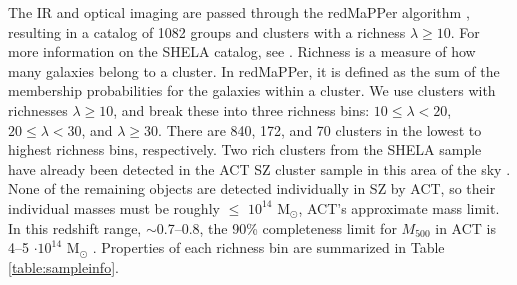 \documentclass[a4paper,fleqn,usenatbib]{mnras}
\begin{document}
The IR and optical imaging are passed through the redMaPPer algorithm \citep{2014ApJ...785..104R}, resulting in a catalog of 1082 groups and clusters with a richness $\lambda \geq 10.$ 
For more information on the SHELA catalog, see \cite{2019ApJS..240....5W}.
Richness is a measure of how many galaxies belong to a cluster. 
In redMaPPer, it is defined as the sum of the membership probabilities for the galaxies within a cluster. 
We use clusters with richnesses $\lambda \geq 10$, and break these into three richness bins: $10 \leq \lambda < 20$, $20 \leq \lambda < 30$, and $\lambda \geq 30$. 
{There are 840, 172, and 70 clusters in the lowest to highest richness bins, respectively.} 
Two rich clusters from the SHELA sample have already been detected in the ACT SZ cluster sample in this area of the sky \citep{2013JCAP...07..008H}.  
None of the remaining objects are detected individually in SZ by ACT, so their individual masses must be roughly $\leq$ $10^{14}$ M$_\odot$, ACT's approximate mass limit.
In this redshift range, $\sim$0.7--0.8, the 90\% completeness limit for $M_{500}$ in ACT is 4--5 $\cdot 10^{14}$ M$_{\odot}$ \citep{2018ApJS..235...20H}.   
Properties of each richness bin are summarized in Table \ref{table:sampleinfo}.
\end{document}
